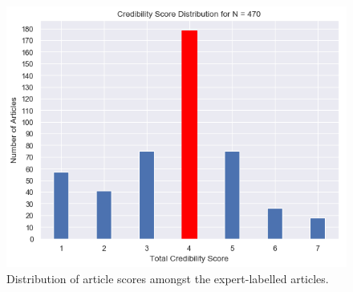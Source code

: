 \documentclass[a4paper,twoside,phd]{BYUPhys}
\begin{document}
\begin{figure}[!htb]
	\centering
	\includegraphics[totalheight=6.5cm]{images/article-score-distribution.png}
	\caption{Distribution of article scores amongst the expert-labelled articles.}
	\label{fig:ArticleDistribution}
\end{figure}
\end{document}
